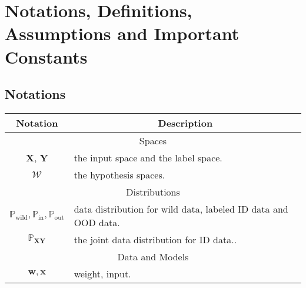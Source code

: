 \section{Notations, Definitions, Assumptions and Important Constants}\label{Sec-Appendix}
\subsection{Notations}
\begin{table}[h!]
    \centering
    \begin{tabular}{c p{10cm}}
        \hline
        \textbf{Notation} & \multicolumn{1}{c}{\textbf{Description}} \\
        \hline
        \multicolumn{2}{c}{\cellcolor{gray!30}Spaces}\\
        \hline
        $\boldsymbol{X}$, $\boldsymbol{Y}$ & the input space and the label space. \\
    
        $\mathcal{W}$ & the hypothesis spaces. \\
        \hline
       \multicolumn{2}{c}{ \cellcolor{gray!30}Distributions}\\
        \hline
        \( \mathbb{P}_{\text{wild}}, \mathbb{P}_{\text{in}}, \mathbb{P}_{\text{out}} \) & data distribution for wild data, labeled ID data and OOD data. \\
        
        \(  \mathbb{P}_{\boldsymbol{XY}} \) & the joint data distribution for ID data.. \\
        \hline
       \multicolumn{2}{c}{ \cellcolor{gray!30}Data and Models}\\
        \hline
        \( \mathbf{w},\mathbf{x} \) & weight, input. \\
        

\end{tabular}
\end{table}
